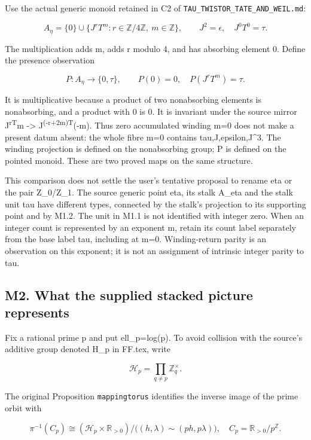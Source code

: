 \documentclass[
]{article}
\begin{document}
Use the actual generic monoid retained in C2 of
\nolinkurl{TAU_TWISTOR_TATE_AND_WEIL.md}:

\[
A_\eta=\{0\}\cup\{J^rT^m:r\in\mathbb Z/4\mathbb Z,\ m\in\mathbb Z\},
\qquad J^2=\epsilon,\quad J^0T^0=\tau.
\tag{M1.1}
\]

The multiplication adds m, adds r modulo 4, and has absorbing element 0.
Define the presence observation

\[
P:A_\eta\longrightarrow\{0,\tau\},\qquad
P(0)=0,\quad P(J^rT^m)=\tau.
\tag{M1.2}
\]

It is multiplicative because a product of two nonabsorbing elements is
nonabsorbing, and a product with 0 is 0. It is invariant under the
source mirror J\textsuperscript{rT}m -\textgreater{}
J\textsuperscript{(-r+2m)T}(-m). Thus zero accumulated winding m=0 does
not make a present datum absent: the whole fibre m=0 contains
tau,J,epsilon,J\^{}3. The winding projection is defined on the
nonabsorbing group; P is defined on the pointed monoid. These are two
proved maps on the same structure.

This comparison does not settle the user's tentative proposal to rename
eta or the pair Z\_0/Z\_1. The source generic point eta, its stalk
A\_eta and the stalk unit tau have different types, connected by the
stalk's projection to its supporting point and by M1.2. The unit in M1.1
is not identified with integer zero. When an integer count is
represented by an exponent m, retain its count label separately from the
base label tau, including at m=0. Winding-return parity is an
observation on this exponent; it is not an assignment of intrinsic
integer parity to tau.

\subsection{M2. What the supplied stacked picture
represents}\label{m2.-what-the-supplied-stacked-picture-represents}

Fix a rational prime p and put ell\_p=log(p). To avoid collision with
the source's additive group denoted H\_p in FF.tex, write

\[
\mathcal H_p=\prod_{q\ne p}\mathbb Z_q^\times.
\tag{M2.1}
\]

The original Proposition \texttt{mappingtorus} identifies the inverse
image of the prime orbit with

\[
\pi^{-1}(C_p)\cong
(\mathcal H_p\times\mathbb R_{>0})/\big((h,\lambda)\sim(ph,p\lambda)\big),
\quad C_p=\mathbb R_{>0}/p^{\mathbb Z}.
\tag{M2.2}
\]
\end{document}
